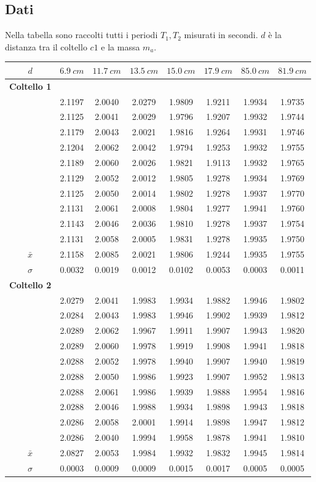 \subsection{Dati}
Nella tabella sono raccolti tutti i periodi $T_1,T_2$ misurati in secondi. $d$ è la distanza tra il coltello $c1$ e la massa $m_a$.
\begin{center}
\begin{tabular}{*{8}{c}}
$d$& $6.9\ cm$ & $11.7\ cm$ & $13.5\ cm$  & $15.0\ cm$ & $17.9\ cm$ & $85.0\ cm$ & $81.9\ cm$ \\
\midrule
 \textbf{Coltello 1}&& & & & & \\
&2.1197 &2.0040&2.0279 &1.9809 & 1.9211 & 1.9934 & 1.9735\\
 &2.1125&2.0041 &2.0029&1.9796 & 1.9207 & 1.9932 & 1.9744 \\
 &2.1179&2.0043 &2.0021&1.9816 & 1.9264 & 1.9931 & 1.9746 \\
 &2.1204&2.0062 &2.0042&1.9794 & 1.9253 & 1.9932 & 1.9755 \\
 &2.1189&2.0060 &2.0026&1.9821 & 1.9113 & 1.9932 & 1.9765 \\
 &2.1129&2.0052&2.0012&1.9805 & 1.9278 & 1.9934 & 1.9769 \\
&2.1125 &2.0050&2.0014&1.9802 & 1.9278 & 1.9937 & 1.9770 \\
&2.1131 &2.0061&2.0008&1.9804 & 1.9277 & 1.9941 & 1.9760 \\
 &2.1143&2.0046&2.0036&1.9810 & 1.9278 & 1.9937 & 1.9754 \\
 &2.1131&2.0058&2.0005& 1.9831 & 1.9278 & 1.9935 & 1.9750 \\
 \midrule
$\bar{x}$& 2.1158 & 2.0085 & 2.0021 & 1.9806 & 1.9244 & 1.9935 & 1.9755\\
$\sigma$ & 0.0032 & 0.0019 & 0.0012 & 0.0102 & 0.0053 & 0.0003 & 0.0011\\
\midrule
\textbf{Coltello 2} && & & & & \\
&2.0279&2.0041&1.9983 &1.9934 & 1.9882 & 1.9946 &	1.9802 \\
&2.0284&2.0043&1.9983 &1.9946 & 1.9902 & 1.9939 &	1.9812 \\
&2.0289&2.0062&1.9967 &1.9911 & 1.9907 & 1.9943 &	1.9820 \\
&2.0289&2.0060&1.9978 &1.9919 & 1.9908 & 1.9941 &	1.9818 \\
&2.0288&2.0052&1.9978 &1.9940 & 1.9907 & 1.9940 &	1.9819 \\
&2.0288&2.0050&1.9986 &1.9923 & 1.9907 & 1.9952 &	1.9813 \\
&2.0288&2.0061&1.9986 &1.9939 & 1.9888 & 1.9954 &	1.9816 \\
&2.0288&2.0046&1.9988 &1.9934 & 1.9898 & 1.9943 & 1.9818 \\
&2.0286&2.0058&2.0001 &1.9914 & 1.9898 & 1.9947 & 1.9812  \\
&2.0286&2.0040&1.9994 &1.9958 & 1.9878 & 1.9941 & 1.9810 \\
 \midrule
$\bar{x}$& 2.0827 & 2.0053 & 1.9984 & 1.9932 & 1.9832 & 1.9945 & 1.9814\\
$\sigma$ & 0.0003 & 0.0009 & 0.0009 & 0.0015 & 0.0017 & 0.0005 & 0.0005\\
\bottomrule
\end{tabular}
\end{center}

